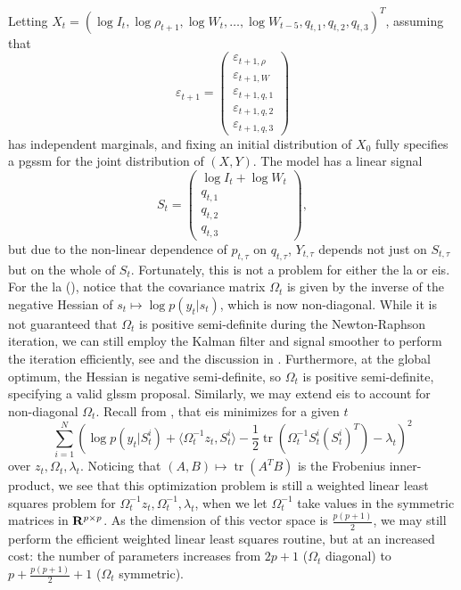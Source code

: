 Letting $X_{t} =\left( \log I_{t}, \log \rho_{t + 1}, \log W_{t}, \dots, \log W_{t - 5}, q_{t,1}, q_{t,2}, q_{t,3}\right)^{T}$, assuming that
$$
\varepsilon_{t + 1} = 
\begin{pmatrix}
     \varepsilon_{t + 1,\rho}\\ \varepsilon_{t + 1, W}\\ \varepsilon_{t +1, q, 1}\\ \varepsilon_{t +1, q, 2}\\ \varepsilon_{t +1, q, 3}
\end{pmatrix}
$$
has independent marginals, and fixing an initial distribution of $X_{0}$ fully specifies a \acrshort{pgssm} for the joint distribution of $(X,Y)$. The model has a linear signal 
$$
    S_{t} = \begin{pmatrix}
        \log I_{t} + \log W_{t} \\
        q_{t, 1} \\
        q_{t, 2} \\
        q_{t, 3} 
    \end{pmatrix},
$$
but due to the non-linear dependence of $p_{t,\tau}$ on $q_{t,\tau}$,  $Y_{t,\tau}$ depends not just on $S_{t, \tau}$ but on the whole of $S_{t}$. Fortunately, this is not a problem for either the \acrshort{la} or \acrshort{eis}. For the \acrshort{la} (), notice that the covariance matrix $\Omega_{t}$ is given by the inverse of the negative Hessian of $s_{t} \mapsto \log p(y_{t}|s_{t})$, which is now non-diagonal. While it is not guaranteed that $\Omega_{t}$ is positive semi-definite during the Newton-Raphson iteration, we can still employ the Kalman filter and signal smoother to perform the iteration efficiently, see \citep{Jungbacker2007Monte} and the discussion in . Furthermore, at the global optimum, the Hessian is negative semi-definite, so $\Omega_{t}$ is positive semi-definite, specifying a valid \acrshort{glssm} proposal. 
Similarly, we may extend \acrshort{eis} to account for non-diagonal $\Omega_{t}$. Recall from , that \acrshort{eis} minimizes for a given $t$ 
$$
    \sum_{i = 1}^N \left( \log p(y_{t} | S^{i}_t) + \langle \Omega_{t}^{-1}z_{t}, S^{i}_{t}\rangle - \frac{1}{2} \operatorname{tr} \left(\Omega^{-1}_{t}S^{i}_{t}(S^{i}_t)^{T}\right)- \lambda_{t} \right)^{2}
$$
over $z_{t}, \Omega_{t}, \lambda_{t}$. Noticing that $(A,B) \mapsto \operatorname{tr} \left( A^{T}B \right)$ is the Frobenius inner-product, we see that this optimization problem is still a weighted linear least squares problem for $\Omega_{t}^{-1}z_{t}, \Omega^{-1}_t, \lambda_{t}$, when we let $\Omega_{t}^{-1}$ take values in the symmetric matrices in $\mathbf R^{p \times p}$. As the dimension of this vector space is $ \frac{p (p + 1)}{2}$, we may still perform the efficient weighted linear least squares routine, but at an increased cost: the number of parameters increases from $2p + 1$ ($\Omega_{t}$ diagonal) to $p + \frac{p(p + 1)}{2} + 1$ ($\Omega_{t}$ symmetric). 

